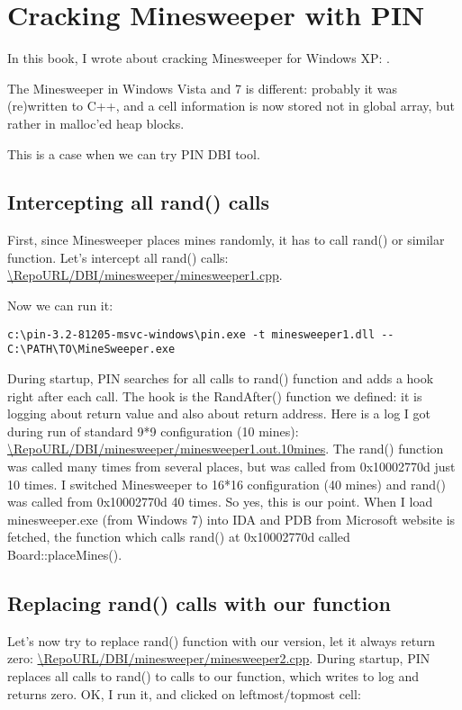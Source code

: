 \section{Cracking Minesweeper with PIN}

\newcommand{\RepoMinesweeperURL}{\RepoURL/DBI/minesweeper}

In this book, I wrote about cracking Minesweeper for Windows XP: .

The Minesweeper in Windows Vista and 7 is different: probably it was (re)written to C++, and a cell information
is now stored not in global array, but rather in malloc'ed heap blocks.

This is a case when we can try PIN DBI tool.

\subsection{Intercepting all rand() calls}

First, since Minesweeper places mines randomly, it has to call rand() or similar function.
Let's intercept all rand() calls: \url{\RepoMinesweeperURL/minesweeper1.cpp}.

Now we can run it:

\begin{lstlisting}
c:\pin-3.2-81205-msvc-windows\pin.exe -t minesweeper1.dll -- C:\PATH\TO\MineSweeper.exe
\end{lstlisting}

During startup, PIN searches for all calls to rand() function and adds a hook right after each call.
The hook is the RandAfter() function we defined: it is logging about return value and also about return address.
Here is a log I got during run of standard 9*9 configuration (10 mines): \url{\RepoMinesweeperURL/minesweeper1.out.10mines}.
The rand() function was called many times from several places, but was called from 0x10002770d just 10 times.
I switched Minesweeper to 16*16 configuration (40 mines) and rand() was called from 0x10002770d 40 times.
So yes, this is our point.
When I load minesweeper.exe (from Windows 7) into IDA and PDB from Microsoft website is fetched,
the function which calls rand() at 0x10002770d called Board::placeMines().

\subsection{Replacing rand() calls with our function}

Let's now try to replace rand() function with our version, let it always return zero: \url{\RepoMinesweeperURL/minesweeper2.cpp}.
During startup, PIN replaces all calls to rand() to calls to our function, which writes to log and returns zero.
OK, I run it, and clicked on leftmost/topmost cell:

